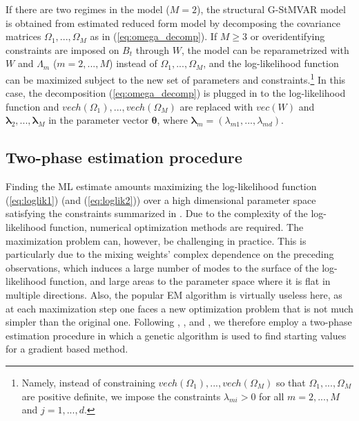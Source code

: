 \documentclass[nojss]{jss} %
\begin{document}
If there are two regimes in the model ($M=2$),  the structural G-StMVAR model is obtained from estimated reduced form model by decomposing the covariance matrices $\Omega_1,...,\Omega_M$ as in (\ref{eq:omega_decomp}).  If $M\geq 3$ or overidentifying constraints are imposed on $B_t$ through $W$,  the model can be reparametrized with $W$ and $\Lambda_m$ ($m=2,...,M$) instead of $\Omega_1,...,\Omega_M$,  and the log-likelihood function can be maximized subject to the new set of parameters and constraints.\footnote{Namely,  instead of constraining $vech(\Omega_1),...,vech(\Omega_M)$ so that $\Omega_1,...,\Omega_M$ are positive definite,  we impose the constraints $\lambda_{mi}>0$ for all $m=2,...,M$ and $j=1,...,d$.} In this case, the decomposition (\ref{eq:omega_decomp}) is plugged in to the log-likelihood function and $vech(\Omega_1),...,vech(\Omega_M)$ are replaced with $vec(W)$ and $\boldsymbol{\lambda}_2,...,\boldsymbol{\lambda}_M$ in the parameter vector $\boldsymbol{\theta}$,  where $\boldsymbol{\lambda}_m=(\lambda_{m1},...,\lambda_{md})$.


\subsection{Two-phase estimation procedure}\label{sec:estimscheme}
Finding the ML estimate amounts maximizing the log-likelihood function (\ref{eq:loglik1}) (and (\ref{eq:loglik2})) over a high dimensional parameter space satisfying the constraints summarized in \citet[Assumption 1]{Virolainen2:2021}.  Due to the complexity of the log-likelihood function, numerical optimization methods are required.  The maximization problem can, however, be challenging in practice.  This is particularly due to the mixing weights' complex dependence on the preceding observations,  which induces a large number of modes to the surface of the log-likelihood function, and large areas to the parameter space where it is flat in multiple directions.  Also, the popular EM algorithm \citep{Redner+Walker:1984} is virtually useless here,  as at each maximization step one faces a new optimization problem that is not much simpler than the original one.  Following \cite{Meitz+Preve+Saikkonen2:2018}, \cite{Meitz+Preve+Saikkonen:2021}, and \cite{Virolainen:2021, uGMAR}, we therefore employ a two-phase estimation procedure in which a genetic algorithm is used to find starting values for a gradient based method.
\end{document}
